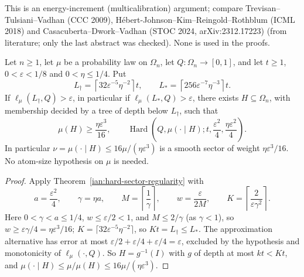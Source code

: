 \begin{remark}\label{ian:hard-sector-literature}
This is an energy-increment (multicalibration) argument; compare Trevisan--Tulsiani--Vadhan (CCC 2009),
H\'ebert-Johnson--Kim--Reingold--Rothblum (ICML 2018) and Casacuberta--Dwork--Vadhan (STOC 2024,
arXiv:2312.17223) (from literature; only the last abstract was checked). None is used in the proofs.
\end{remark}

\begin{corollary} \label{ian:hard-sector-explicit}
Let \(n\ge1\), let \(\mu\) be a probability law on \(\Omega_n\), let \(Q:\Omega_n\to[0,1]\), and let \(t\ge1\),
\(0<\varepsilon<1/8\) and \(0<\eta\le1/4\). Put
\[
 L_\dagger=\left\lceil32\varepsilon^{-5}\eta^{-2}\right\rceil t, \qquad L_*=\left\lceil256\varepsilon^{-7}\eta^{-3}\right\rceil t.
\]
If \(\ell_\mu(L_\dagger,Q)>\varepsilon\), in particular if \(\ell_\mu(L_*,Q)>\varepsilon\), there exists
\(H\subseteq\Omega_n\), with membership decided by a tree of depth below \(L_\dagger\), such that
\[
 \mu(H)\ge\frac{\eta\varepsilon^3}{16}, \qquad \operatorname{Hard}\left( Q,\mu(\cdot\mid H); t,\frac{\varepsilon^2}{4}, \frac{\eta\varepsilon^2}{4}\right).
\]
In particular \(\nu=\mu(\cdot\mid H)\le16\mu/(\eta\varepsilon^3)\) is a smooth sector of weight
\(\eta\varepsilon^3/16\). No atom-size hypothesis on \(\mu\) is needed.
\end{corollary}
\begin{proof}
Apply Theorem~\ref{ian:hard-sector-regularity} with
\[
 a=\frac{\varepsilon^2}{4},\qquad\gamma=\eta a,\qquad M=\left\lceil\frac1\gamma\right\rceil,\qquad
 w=\frac{\varepsilon}{2M},\qquad K=\left\lceil\frac2{\varepsilon\gamma^2}\right\rceil.
\]
Here \(0<\gamma<a\le1/4\), \(w\le\varepsilon/2<1\), and \(M\le2/\gamma\) (as \(\gamma<1\)), so
\(w\ge\varepsilon\gamma/4=\eta\varepsilon^3/16\); \(K=\lceil32\varepsilon^{-5}\eta^{-2}\rceil\), so
\(Kt=L_\dagger\le L_*\). The approximation alternative has error at most
\(\varepsilon/2+\varepsilon/4+\varepsilon/4=\varepsilon\), excluded by the hypothesis and monotonicity of
\(\ell_\mu(\cdot,Q)\). So \(H=g^{-1}(I)\) with \(g\) of depth at most \(kt<Kt\), and \(\mu(\cdot\mid
H)\le\mu/\mu(H)\le16\mu/(\eta\varepsilon^3)\).
\end{proof}

